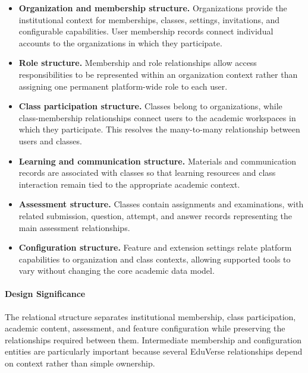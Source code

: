 \begin{itemize}
  \item \textbf{Organization and membership structure.}
    Organizations provide the institutional context for memberships, classes,
    settings, invitations, and configurable capabilities. User membership
    records connect individual accounts to the organizations in which they
    participate.

  \item \textbf{Role structure.}
    Membership and role relationships allow access responsibilities to be
    represented within an organization context rather than assigning one
    permanent platform-wide role to each user.

  \item \textbf{Class participation structure.}
    Classes belong to organizations, while class-membership relationships
    connect users to the academic workspaces in which they participate. This
    resolves the many-to-many relationship between users and classes.

  \item \textbf{Learning and communication structure.}
    Materials and communication records are associated with classes so that
    learning resources and class interaction remain tied to the appropriate
    academic context.

  \item \textbf{Assessment structure.}
    Classes contain assignments and examinations, with related submission,
    question, attempt, and answer records representing the main assessment
    relationships.

  \item \textbf{Configuration structure.}
    Feature and extension settings relate platform capabilities to organization
    and class contexts, allowing supported tools to vary without changing the
    core academic data model.
\end{itemize}

\paragraph*{Design Significance}

The relational structure separates institutional membership, class
participation, academic content, assessment, and feature configuration while
preserving the relationships required between them. Intermediate membership
and configuration entities are particularly important because several
EduVerse relationships depend on context rather than simple ownership.

